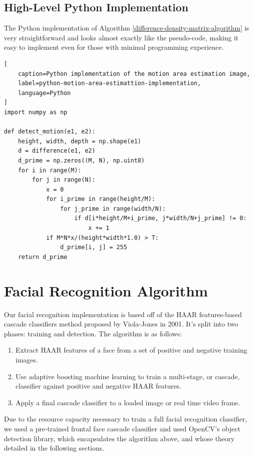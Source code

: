 \documentclass[journal]{IEEEtran}
\begin{document}
\subsection{High-Level Python Implementation}
The Python implementation of Algorithm \ref{difference-density-matrix-algorithm} is very straightforward and looks almost exactly like the pseudo-code, making it easy to implement even for those with minimal programming experience.
\begin{lstlisting}[
	caption=Python implementation of the motion area estimation image,
	label=python-motion-area-estimattion-implementation,
	language=Python
]
import numpy as np

def detect_motion(e1, e2):
    height, width, depth = np.shape(e1)
    d = difference(e1, e2)
    d_prime = np.zeros((M, N), np.uint8)
    for i in range(M):
        for j in range(N):
            x = 0
            for i_prime in range(height/M):
                for j_prime in range(width/N):
                    if d[i*height/M+i_prime, j*width/N+j_prime] != 0:
                        x += 1
            if M*N*x/(height*width*1.0) > T:
                d_prime[i, j] = 255
    return d_prime
\end{lstlisting}


\section{Facial Recognition Algorithm}
\label{facial-recognition-section}
Our facial recognition implementation is based off of the HAAR features-based cascade classifiers method proposed by Viola-Jones in 2001. It's split into two phases: training and detection. The algorithm is as follows:
\begin{enumerate}
	\item Extract HAAR features of a face from a set of positive and negative training images. 
	\item Use adaptive boosting machine learning to train a multi-stage, or cascade, classifier against positive and negative HAAR features. 
	\item Apply a final cascade classifier to a loaded image or real time video frame. 
\end{enumerate}
Due to the resource capacity necessary to train a full facial recognition classifier, we used a pre-trained frontal face cascade classifier and used OpenCV's object detection library, which encapsulates the algorithm above, and whose theory detailed in the following sections.
\end{document}
